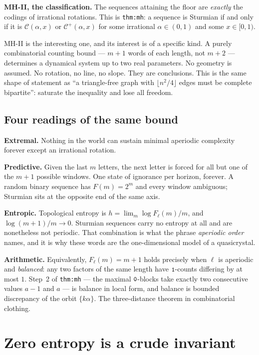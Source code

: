\documentclass[11pt,a4paper]{article}
\newcommand{\seq}[1]{\texttt{\small #1}}
\newcommand{\C}{\mathcal{C}}
\newcommand{\Cp}{\mathcal{C}^{+}}
\theoremstyle{definition}
\theoremstyle{plain}
\begin{document}
\textbf{MH-II, the classification.} The sequences attaining the floor are
\emph{exactly} the codings of irrational rotations. This is \texttt{thm:mh}: a
sequence is Sturmian if and only if it is $\C(\alpha,x)$ or $\Cp(\alpha,x)$ for
some irrational $\alpha \in (0,1)$ and some $x \in [0,1)$.

MH-II is the interesting one, and its interest is of a specific kind. A purely
combinatorial counting bound --- $m+1$ words of each length, not $m+2$ ---
determines a dynamical system up to two real parameters. No geometry is
assumed. No rotation, no line, no slope. They are conclusions. This is the same
shape of statement as ``a triangle-free graph with $\lfloor n^2/4 \rfloor$
edges must be complete bipartite'': saturate the inequality and lose all
freedom.

\subsection{Four readings of the same bound}

\textbf{Extremal.} Nothing in the world can sustain minimal aperiodic
complexity forever except an irrational rotation.

\textbf{Predictive.} Given the last $m$ letters, the next letter is forced for
all but one of the $m+1$ possible windows. One state of ignorance per horizon,
forever. A random binary sequence has $F(m) = 2^m$ and every window ambiguous;
Sturmian sits at the opposite end of the same axis.

\textbf{Entropic.} Topological entropy is
$h = \lim_m \log F_\ell(m) / m$, and $\log(m+1)/m \to 0$. Sturmian sequences
carry no entropy at all and are nonetheless not periodic. That combination is
what the phrase \emph{aperiodic order} names, and it is why these words are the
one-dimensional model of a quasicrystal.

\textbf{Arithmetic.} Equivalently, $F_\ell(m) = m+1$ holds precisely when $\ell$
is aperiodic and \emph{balanced}: any two factors of the same length have
$\seq{1}$-counts differing by at most $1$. Step~2 of \texttt{thm:mh} --- the
maximal $\seq{0}$-blocks take exactly two consecutive values $a-1$ and $a$ ---
is balance in local form, and balance is bounded discrepancy of the orbit
$\{k\alpha\}$. The three-distance theorem in combinatorial clothing.

\section{Zero entropy is a crude invariant}
\end{document}
